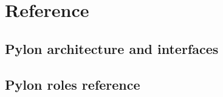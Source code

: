 \documentclass[12pt]{article}
\begin{document}










\section{Reference}


\subsection{Pylon architecture and interfaces}



\subsection{Pylon roles reference}


\end{document}
